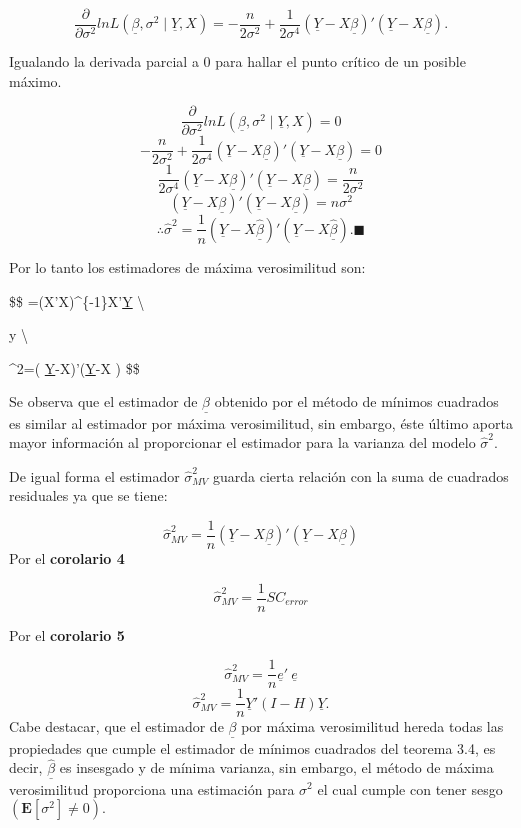 \documentclass[a4paper,oneside,openany]{book}
\begin{document}
\[\frac{\partial}{\partial\sigma^2}lnL(\underline{\beta},\sigma^2 \mid \underline{Y},X)=-\frac{n}{2\sigma^2}+\frac{1}{2\sigma^4}(\underline{Y}-X\underline{\beta})'(\underline{Y}-X\underline{\beta}).\]

Igualando la derivada parcial a 0 para hallar el punto crítico de un
posible máximo.

\[\frac{\partial}{\partial\sigma^2}lnL(\underline{\beta}, \sigma^2 \mid \underline{Y},X)=0\]
\[-\frac{n}{2\sigma^2}+\frac{1}{2\sigma^4}(\underline{Y}-X\underline{\beta})'(\underline{Y}-X\underline{\beta})=0\]
\[\frac{1}{2\sigma^4}(\underline{Y}-X\underline{\beta})'(\underline{Y}-X\underline{\beta})=\frac{n}{2\sigma^2}\]
\[(\underline{Y}-X\underline{\beta})'(\underline{Y}-X\underline{\beta})=n\sigma^2\]
\[\therefore \hat{\sigma}^2=\frac{1}{n}\left( \underline{Y}-X\underline{\hat{\beta}}\right)'\left(\underline{Y}-X \underline{\hat{\beta}}\right).\blacksquare\]

Por lo tanto los estimadores de máxima verosimilitud son:

\$\$ \underline{\hat{\beta}}=(X'X)\^{}\{-1\}X'\underline{Y}
\textbackslash{}

y \textbackslash{}

\hat{\sigma}\^{}2=\left(
\underline{Y}-X\underline{\hat{\beta}}\right)'\left(\underline{Y}-X
\underline{\hat{\beta}}\right) \blacksquare
\$\$

Se observa que el estimador de \(\underline{\beta}\) obtenido por el
método de mínimos cuadrados es similar al estimador por máxima
verosimilitud, sin embargo, éste último aporta mayor información al
proporcionar el estimador para la varianza del modelo
\(\hat{\sigma}^2.\)

De igual forma el estimador \(\hat{\sigma}^2_{MV}\) guarda cierta
relación con la suma de cuadrados residuales ya que se tiene:

\[\hat{\sigma}^2_{MV}=\frac{1}{n}(\underline{Y}-X\underline{\beta})'(\underline{Y}-X\underline{\beta})\]
Por el \textbf{corolario 4}

\[\hat{\sigma}^2_{MV}=\frac{1}{n}SC_{error}\]

Por el \textbf{corolario 5}

\[\hat{\sigma}^2_{MV}=\frac{1}{n}\underline{e}' \ \underline{e}\]
\[\hat{\sigma}^2_{MV}=\frac{1}{n}\underline{Y}'(I-H)\underline{Y}.\]
Cabe destacar, que el estimador de \(\underline{\beta}\) por máxima
verosimilitud hereda todas las propiedades que cumple el estimador de
mínimos cuadrados del teorema 3.4, es decir, \(\underline{\hat{\beta}}\)
es insesgado y de mínima varianza, sin embargo, el método de máxima
verosimilitud proporciona una estimación para \(\sigma^2\) el cual
cumple con tener sesgo \((\mathbf{E}[\sigma^2]\neq 0).\)
\end{document}
